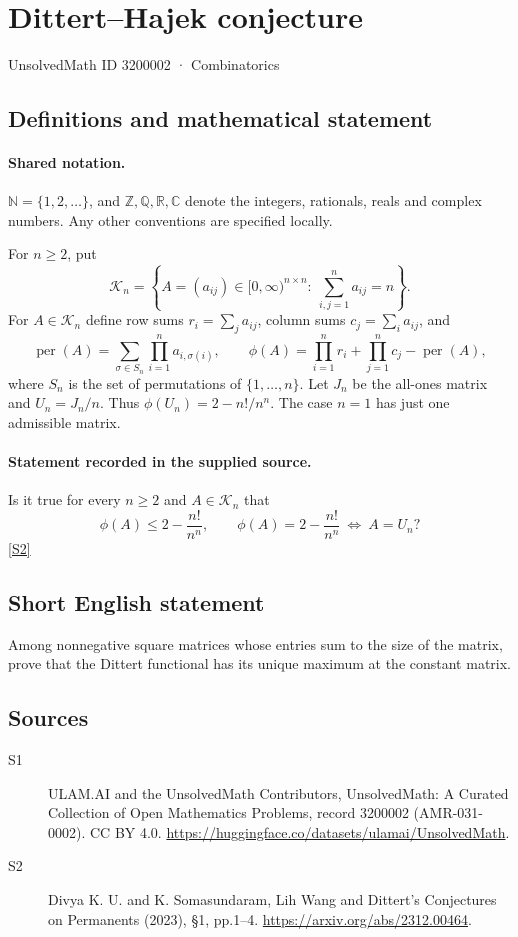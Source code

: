 \documentclass[11pt]{article}
\newcommand{\sref}[2]{\hyperlink{source:#1:#2}{[S#2]}}
\begin{document}
\setcounter{section}{3200001}
\section{Dittert–Hajek conjecture}\label{3200002}
{\small\sffamily UnsolvedMath ID 3200002 · Combinatorics}
\subsection{Definitions and mathematical statement}

\paragraph{Shared notation.}$\mathbb N=\{1,2,\ldots\}$, and $\mathbb Z,\mathbb Q,\mathbb R,\mathbb C$ denote the integers, rationals, reals and complex numbers. Any other conventions are specified locally.


For $n\ge2$, put
\[
\mathcal K_n=\left\{A=(a_{ij})\in[0,\infty)^{n\times n}:\ \sum_{i,j=1}^{n}a_{ij}=n\right\}.
\]
For $A\in\mathcal K_n$ define row sums $r_i=\sum_j a_{ij}$, column sums $c_j=\sum_i a_{ij}$, and
\[
\operatorname{per}(A)=\sum_{\sigma\in S_n}\prod_{i=1}^{n}a_{i,\sigma(i)},\qquad
\phi(A)=\prod_{i=1}^{n}r_i+\prod_{j=1}^{n}c_j-\operatorname{per}(A),
\]
where $S_n$ is the set of permutations of $\{1,\ldots,n\}$. Let $J_n$ be the all-ones matrix and $U_n=J_n/n$. Thus $\phi(U_n)=2-n!/n^n$. The case $n=1$ has just one admissible matrix.
\paragraph{Statement recorded in the supplied source.}
Is it true for every $n\ge2$ and $A\in\mathcal K_n$ that
\[
\phi(A)\le 2-\frac{n!}{n^n},\qquad
\phi(A)=2-\frac{n!}{n^n}\ \Longleftrightarrow\ A=U_n?
\] \sref{3200002}{2}
\subsection{Short English statement}
Among nonnegative square matrices whose entries sum to the size of the matrix, prove that the Dittert functional has its unique maximum at the constant matrix.
\subsection{Sources}
\begin{description}
\item[\hypertarget{source:3200002:1}{S1}] ULAM.AI and the UnsolvedMath Contributors, UnsolvedMath: A Curated Collection of Open Mathematics Problems, record 3200002 (AMR-031-0002). CC BY 4.0. \url{https://huggingface.co/datasets/ulamai/UnsolvedMath}.
\item[\hypertarget{source:3200002:2}{S2}] Divya K. U. and K. Somasundaram, Lih Wang and Dittert’s Conjectures on Permanents (2023), §1, pp.1–4. \url{https://arxiv.org/abs/2312.00464}.
\end{description}
\label{end:3200002}
\end{document}
